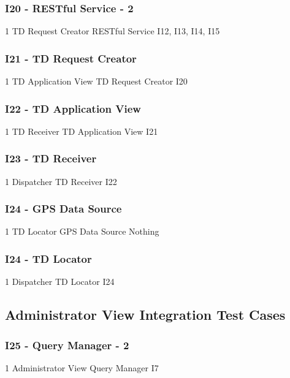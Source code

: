 \subsubsection{I20 - RESTful Service - 2}
\testCaseSimpleSimple
	{1}
	{TD Request Creator}
	{RESTful Service}
	{I12, I13, I14, I15}
\subsubsection{I21 - TD Request Creator}
\testCaseSimpleSimple
	{1}
	{TD Application View}
	{TD Request Creator}
	{I20}
\subsubsection{I22 - TD Application View}
\testCaseSimpleSimple
	{1}
	{TD Receiver}
	{TD Application View}
	{I21}
\subsubsection{I23 - TD Receiver}
\testCaseSimpleSimple
	{1}
	{Dispatcher}
	{TD Receiver}
	{I22}
\subsubsection{I24 - GPS Data Source}
\testCaseSimpleSimple
	{1}
	{TD Locator}
	{GPS Data Source}
	{Nothing}
\subsubsection{I24 - TD Locator}
\testCaseSimpleSimple
	{1}
	{Dispatcher}
	{TD Locator}
	{I24}
\subsection{Administrator View Integration Test Cases}
\subsubsection{I25 - Query Manager - 2}
\testCaseSimpleSimple
	{1}
	{Administrator View}
	{Query Manager}
	{I7}
